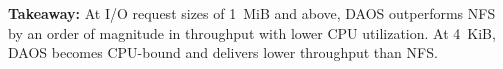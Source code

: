 
\begin{takeaway}
\textbf{Takeaway:} At I/O request sizes of 1~MiB and above, DAOS outperforms NFS by an order of magnitude in throughput with lower CPU utilization. At 4~KiB, DAOS becomes CPU-bound and delivers lower throughput than NFS.
\end{takeaway}

